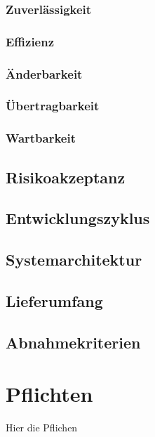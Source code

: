 \documentclass[a4paper,12pt]{article}
\begin{document}
            \subsubsection{Zuverlässigkeit}
            
            
            \subsubsection{Effizienz}
            
            
            \subsubsection{Änderbarkeit}
            
            
            \subsubsection{Übertragbarkeit}
            
            
            \subsubsection{Wartbarkeit}
            
        
        \subsection{Risikoakzeptanz}
 		
        
        \subsection{Entwicklungszyklus}
 		
        
        \subsection{Systemarchitektur} %
 		
        
        \subsection{Lieferumfang} %
 		
        
        \subsection{Abnahmekriterien} %
 		
 	\clearpage

	\section{Pflichten}
 	Hier die Pflichen
\end{document}
